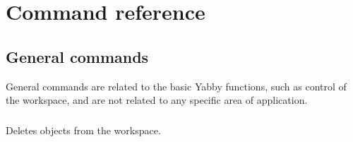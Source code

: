 

\setcounter{section}{0}

\chapter{Command reference}

\section{General commands}

General commands are related to the basic Yabby functions, such as
control of the workspace, and are not related to any specific area
of application. 



\subsection[delete]{  }



Deletes objects from the workspace.


